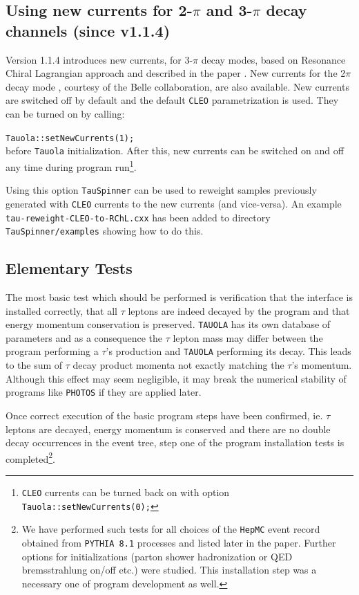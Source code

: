 \documentclass[]{Tauola_interface_design}
\begin{document}
\subsection{Using new currents for 2-$\pi$ and 3-$\pi$ decay channels (since v1.1.4)}
\label{sec:new-currents}

Version 1.1.4 introduces new currents, for 3-$\pi$ decay modes, based on
Resonance Chiral Lagrangian approach and described in the paper \cite{Nugent:2013hxa}.
New currents for the 2$\pi$ decay mode \cite{Fujikawa:2008ma}, courtesy 
of the Belle collaboration, are also available.
New currents are switched off by default and the default {\tt CLEO} parametrization
is used. They can be turned on by calling:

\noindent
{\tt Tauola::setNewCurrents(1);} \hfill \\

before {\tt Tauola} initialization. After this, new currents can be switched
on and off any time during program run\footnote{{\tt CLEO} currents
can be turned back on with option {\tt Tauola::setNewCurrents(0);}}.

Using this option {\tt TauSpinner} can be used to reweight samples previously
generated with {\tt CLEO} currents to the new currents (and vice-versa). An
example {\tt tau-reweight-CLEO-to-RChL.cxx} has been added to directory
{\tt TauSpinner/examples} showing how to do this.

\subsection{Elementary Tests}
\label{sect:elem}
The most basic test which should be performed is verification that the interface is installed correctly, that all
$\tau$ leptons are indeed decayed by the program and that energy 
momentum conservation is preserved. {\tt TAUOLA} has its own database of parameters
and as a consequence the $\tau$ lepton mass may differ between the 
program performing a $\tau$'s production and {\tt TAUOLA} performing its decay. This leads to the sum of 
$\tau$ decay product momenta not exactly matching the $\tau$'s momentum. Although
this effect may seem negligible, it may break the numerical stability of 
programs like {\tt PHOTOS} if they are applied later.

Once correct execution of the basic program steps have been confirmed, ie. $\tau$ leptons are 
decayed, energy momentum is conserved and there are no double 
decay occurrences in the event tree, step one of the program installation tests 
 is completed\footnote{
We have  performed such  tests for all choices of the {\tt HepMC} event record obtained 
from  {\tt PYTHIA 8.1} processes and 
listed later in the paper. Further  options for initializations 
(parton shower hadronization or QED bremsstrahlung on/off etc.) were studied.
This installation step  was a necessary one of program development as well.}.
\end{document}
